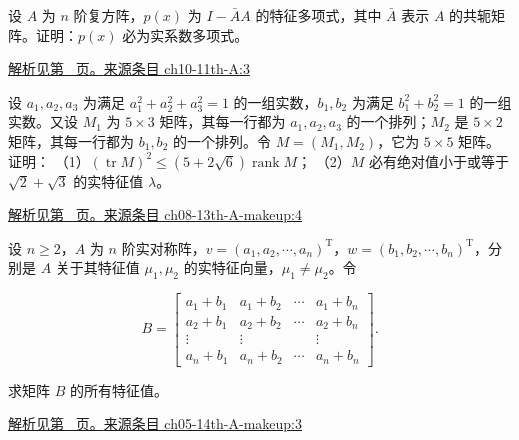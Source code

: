 \documentclass[12pt,fontset=fandol]{ctexart}
\begin{document}
\begin{example}\label{ex:ch10-11th-A:3}

设 $A$ 为 $n$ 阶复方阵，$p(x)$ 为 $I-\bar{A}A$ 的特征多项式，其中 $\bar{A}$ 表示 $A$ 的共轭矩阵。证明：$p(x)$ 必为实系数多项式。

\par\hyperref[ans:ch10-11th-A:3]{解析见第~\pageref{ans:ch10-11th-A:3} 页。}\quad\href{https://github.com/lzxcr/cmc-mathematics/blob/64916fa1fdbc3e444a652eca204d5669058ee321/src/problems/preliminary/11/03.md}{来源条目 ch10-11th-A:3}

\end{example}

\begin{example}\label{ex:ch08-13th-A-makeup:4}

设 $a_{1},a_{2},a_{3}$ 为满足 $a_{1}^{2}+a_{2}^{2}+a_{3}^{2}=1$ 的一组实数，$b_{1},b_{2}$ 为满足 $b_{1}^{2}+b_{2}^{2}=1$ 的一组实数。又设 $M_{1}$ 为 $5\times 3$ 矩阵，其每一行都为 $a_{1},a_{2},a_{3}$ 的一个排列；$M_{2}$ 是 $5\times 2$ 矩阵，其每一行都为 $b_{1},b_{2}$ 的一个排列。令 $M=\left(M_{1},M_{2}\right)$，它为 $5\times 5$ 矩阵。证明：
（1）$(\operatorname{tr}M)^{2}\leq(5+2\sqrt{6})\operatorname{rank}M$；
（2）$M$ 必有绝对值小于或等于 $\sqrt{2}+\sqrt{3}$ 的实特征值 $\lambda$。

\par\hyperref[ans:ch08-13th-A-makeup:4]{解析见第~\pageref{ans:ch08-13th-A-makeup:4} 页。}\quad\href{https://github.com/lzxcr/cmc-mathematics/blob/64916fa1fdbc3e444a652eca204d5669058ee321/src/problems/preliminary/13-makeup/04.md}{来源条目 ch08-13th-A-makeup:4}

\end{example}

\begin{example}\label{ex:ch05-14th-A-makeup:3}

设 $n \geq 2$，$A$ 为 $n$ 阶实对称阵，$v = \left(a_1,a_2,\cdots,a_n\right)^{\mathrm{T}}$，$w = \left(b_1,b_2,\cdots,b_n\right)^{\mathrm{T}}$，分别是 $A$ 关于其特征值 $\mu_1, \mu_2$ 的实特征向量，$\mu_1 \neq \mu_2$。令

\[
B = \begin{bmatrix}
a_1+b_1 & a_1+b_2 & \cdots & a_1+b_n \\
a_2+b_1 & a_2+b_2 & \cdots & a_2+b_n \\
\vdots & \vdots & & \vdots \\
a_n+b_1 & a_n+b_2 & \cdots & a_n+b_n
\end{bmatrix}.
\]

求矩阵 $B$ 的所有特征值。

\par\hyperref[ans:ch05-14th-A-makeup:3]{解析见第~\pageref{ans:ch05-14th-A-makeup:3} 页。}\quad\href{https://github.com/lzxcr/cmc-mathematics/blob/64916fa1fdbc3e444a652eca204d5669058ee321/src/problems/preliminary/14-makeup/03.md}{来源条目 ch05-14th-A-makeup:3}

\end{example}
\end{document}
